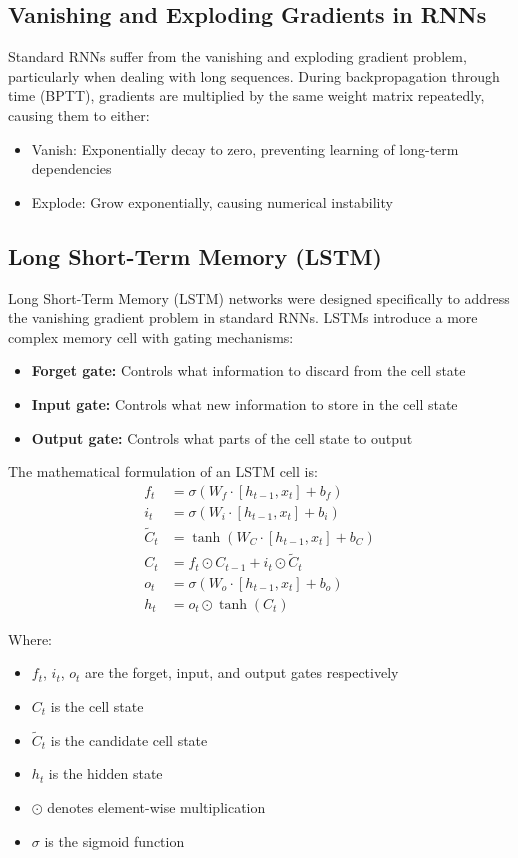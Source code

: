 \documentclass[11pt,a4paper]{report}
\begin{document}
\subsection{Vanishing and Exploding Gradients in RNNs}
Standard RNNs suffer from the vanishing and exploding gradient problem, particularly when dealing with long sequences. During backpropagation through time (BPTT), gradients are multiplied by the same weight matrix repeatedly, causing them to either:
\begin{itemize}
    \item Vanish: Exponentially decay to zero, preventing learning of long-term dependencies
    \item Explode: Grow exponentially, causing numerical instability
\end{itemize}

\subsection{Long Short-Term Memory (LSTM)}
Long Short-Term Memory (LSTM) networks were designed specifically to address the vanishing gradient problem in standard RNNs. LSTMs introduce a more complex memory cell with gating mechanisms:

\begin{itemize}
    \item \textbf{Forget gate:} Controls what information to discard from the cell state
    \item \textbf{Input gate:} Controls what new information to store in the cell state
    \item \textbf{Output gate:} Controls what parts of the cell state to output
\end{itemize}

The mathematical formulation of an LSTM cell is:
\begin{align}
f_t &= \sigma(W_f \cdot [h_{t-1}, x_t] + b_f) \\
i_t &= \sigma(W_i \cdot [h_{t-1}, x_t] + b_i) \\
\tilde{C}_t &= \tanh(W_C \cdot [h_{t-1}, x_t] + b_C) \\
C_t &= f_t \odot C_{t-1} + i_t \odot \tilde{C}_t \\
o_t &= \sigma(W_o \cdot [h_{t-1}, x_t] + b_o) \\
h_t &= o_t \odot \tanh(C_t)
\end{align}

Where:
\begin{itemize}
    \item $f_t$, $i_t$, $o_t$ are the forget, input, and output gates respectively
    \item $C_t$ is the cell state
    \item $\tilde{C}_t$ is the candidate cell state
    \item $h_t$ is the hidden state
    \item $\odot$ denotes element-wise multiplication
    \item $\sigma$ is the sigmoid function
\end{itemize}
\end{document}
